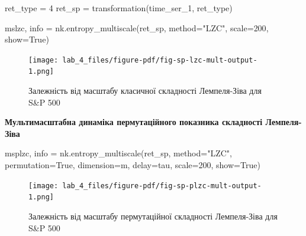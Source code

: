 \documentclass[
  letterpaper,
]{report}
\newenvironment{Shaded}{\begin{snugshade}}{\end{snugshade}}
\newcommand{\DecValTok}[1]{\textcolor[rgb]{0.68,0.00,0.00}{#1}}
\newcommand{\NormalTok}[1]{\textcolor[rgb]{0.00,0.23,0.31}{#1}}
\newcommand{\OperatorTok}[1]{\textcolor[rgb]{0.37,0.37,0.37}{#1}}
\newcommand{\StringTok}[1]{\textcolor[rgb]{0.13,0.47,0.30}{#1}}
\newcommand{\VariableTok}[1]{\textcolor[rgb]{0.07,0.07,0.07}{#1}}
\begin{document}
\begin{Shaded}
\begin{Highlighting}[]
\NormalTok{ret\_type }\OperatorTok{=} \DecValTok{4}
\NormalTok{ret\_sp }\OperatorTok{=}\NormalTok{ transformation(time\_ser\_1, ret\_type)}
\end{Highlighting}
\end{Shaded}

\begin{Shaded}
\begin{Highlighting}[]
\NormalTok{mslzc, info }\OperatorTok{=}\NormalTok{ nk.entropy\_multiscale(ret\_sp, method}\OperatorTok{=}\StringTok{"LZC"}\NormalTok{, }
\NormalTok{                                    scale}\OperatorTok{=}\DecValTok{200}\NormalTok{, show}\OperatorTok{=}\VariableTok{True}\NormalTok{)}
\end{Highlighting}
\end{Shaded}

\begin{figure}[H]

{\centering \texttt{[image: lab\_4\_files/figure-pdf/fig-sp-lzc-mult-output-1.png]}

}

\caption{\label{fig-sp-lzc-mult}Залежність від масштабу класичної
складності Лемпеля-Зіва для S\&P 500}

\end{figure}

\textbf{Мультимасштабна динаміка пермутаційного показника складності
Лемпеля-Зіва}

\begin{Shaded}
\begin{Highlighting}[]
\NormalTok{msplzc, info }\OperatorTok{=}\NormalTok{ nk.entropy\_multiscale(ret\_sp, }
\NormalTok{                                        method}\OperatorTok{=}\StringTok{"LZC"}\NormalTok{,  }
\NormalTok{                                        permutation}\OperatorTok{=}\VariableTok{True}\NormalTok{,}
\NormalTok{                                        dimension}\OperatorTok{=}\NormalTok{m,}
\NormalTok{                                        delay}\OperatorTok{=}\NormalTok{tau, }
\NormalTok{                                        scale}\OperatorTok{=}\DecValTok{200}\NormalTok{, }
\NormalTok{                                        show}\OperatorTok{=}\VariableTok{True}\NormalTok{)}
\end{Highlighting}
\end{Shaded}

\begin{figure}[H]

{\centering \texttt{[image: lab\_4\_files/figure-pdf/fig-sp-plzc-mult-output-1.png]}

}

\caption{\label{fig-sp-plzc-mult}Залежність від масштабу пермутаційної
складності Лемпеля-Зіва для S\&P 500}

\end{figure}
\end{document}
